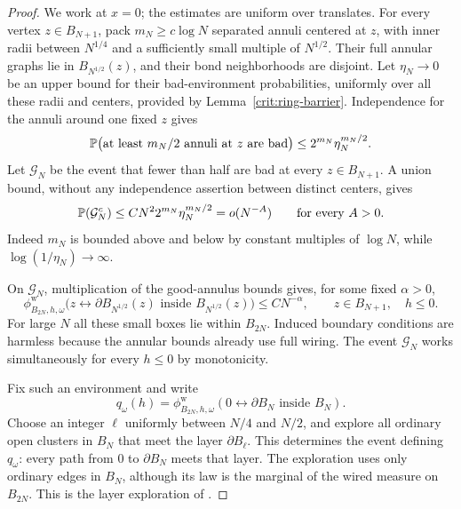 \begin{proof}
We work at $x=0$; the estimates are uniform over translates. For every
vertex $z\in B_{N+1}$, pack $m_N\ge c\log N$ separated annuli centered
at $z$, with inner radii between $N^{1/4}$ and a sufficiently small
multiple of $N^{1/2}$. Their full annular graphs lie in
$B_{N^{1/2}}(z)$, and their bond neighborhoods are disjoint. Let
$\eta_N\to0$ be an upper bound for their bad-environment probabilities,
uniformly over all these radii and centers, provided by
Lemma~\ref{crit:ring-barrier}. Independence for the annuli around one
fixed $z$ gives
\[
 \mathbb P\bigl(\text{at least }m_N/2\text{ annuli at }z
                      \text{ are bad}\bigr)
       \le 2^{m_N}\eta_N^{m_N/2}.
\]
Let $\mathcal G_N$ be the event that fewer than half are bad at every
$z\in B_{N+1}$. A union bound, without any independence assertion
between distinct centers, gives
\begin{equation}
 \mathbb P(\mathcal G_N^c)
 \le C N^2 2^{m_N}\eta_N^{m_N/2}
       =o(N^{-A})\qquad\text{for every }A>0.
 \label{crit:environment-exception}
\end{equation}
Indeed $m_N$ is bounded above and below by constant multiples of
$\log N$, while $\log(1/\eta_N)\to\infty$.

On $\mathcal G_N$, multiplication of the good-annulus bounds gives,
for some fixed $\alpha>0$,
\begin{equation}
 \phi_{B_{2N},h,\omega}^{\mathrm w}
 \bigl(z\leftrightarrow\partial B_{N^{1/2}}(z)
                   \text{ inside }B_{N^{1/2}}(z)\bigr)
       \le C N^{-\alpha},
 \qquad z\in B_{N+1},\quad h\le0.
 \label{crit:uniform-short-arm}
\end{equation}
For large $N$ all these small boxes lie within $B_{2N}$. Induced
boundary conditions are harmless because the annular bounds already
use full wiring. The event $\mathcal G_N$ works simultaneously for
every $h\le0$ by monotonicity.

Fix such an environment and write
\[
 q_\omega(h)=\phi_{B_{2N},h,\omega}^{\mathrm w}
     (0\leftrightarrow\partial B_N\text{ inside }B_N).
\]
Choose an integer $\ell$ uniformly between $N/4$ and $N/2$, and
explore all ordinary open clusters in $B_N$ that meet the layer
$\partial B_\ell$. This determines the event defining $q_\omega$:
every path from $0$ to $\partial B_N$ meets that layer. The exploration
uses only ordinary edges in $B_N$, although its law is the marginal
of the wired measure on $B_{2N}$. This is the layer exploration of
\cite[Lemma~3.2 and its proof]{DCRT}.


\end{proof}

